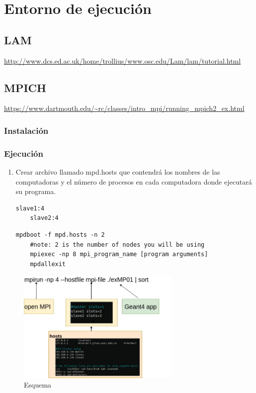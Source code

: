 \section{Entorno de ejecución}
\subsection{LAM}
\url{http://www.dcs.ed.ac.uk/home/trollius/www.osc.edu/Lam/lam/tutorial.html}
\subsection{MPICH}
\url{https://www.dartmouth.edu/~rc/classes/intro_mpi/running_mpich2_ex.html}
\subsubsection{Instalación}



\subsubsection{Ejecución}

\begin{enumerate}
    \item Crear archivo llamado mpd.hosts que contendrá los nombres de las computadoras y el número de procesos en cada computadora donde ejecutará su programa.
\lstset{language=bash, breaklines=true, basicstyle=\footnotesize}
\begin{lstlisting}[frame=single] 
    slave1:4
    slave2:4
\end{lstlisting}



\lstset{language=bash, breaklines=true, basicstyle=\footnotesize}
\begin{lstlisting}[frame=single] 
    mpdboot -f mpd.hosts -n 2
    #note: 2 is the number of nodes you will be using
    mpiexec -np 8 mpi_program_name [program arguments]
    mpdallexit
\end{lstlisting}

\end{enumerate}


\begin{figure}[H]
    \centering
  \includegraphics[width=0.7\textwidth]{images/execution.jpg}
  \caption{Esquema}
  \label{esq}
\end{figure}

\newpage